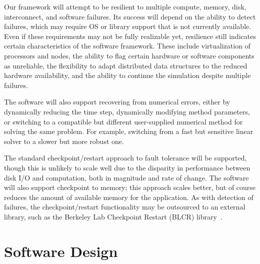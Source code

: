 \documentclass[10pt,twocolumn]{article}
\begin{document}
Our framework will attempt to be resilient to multiple compute,
memory, disk, interconnect, and software failures.  Its success will
depend on the ability to detect failures, which may require OS or
library support that is not currently available.  Even if these
requirements may not be fully realizable yet, resilience still
indicates certain characteristics of the software framework.  These
include virtualization of processors and nodes, the ability to flag
certain hardware or software components as unreliable, the flexibility
to adapt distributed data structures to the reduced hardware
availability, and the ability to continue the simulation despite
multiple failures.

The software will also support recovering from numerical errors,
either by dynamically reducing the time step, dynamically modifying
method parameters, or switching to a compatible but different
user-supplied numerical method for solving the same problem.  For
example, switching from a fast but sensitive linear solver to a slower
but more robust one.

The standard checkpoint/restart approach to fault tolerance will be
supported, though this is unlikely to scale well due to the disparity
in performance between disk I/O and computation, both in magnitude and
rate of change.  The software will also support checkpoint to
memory; this approach scales better, but of course reduces the amount
of available memory for the application.  As with detection of
failures, the checkpoint/restart functionality may be outsourced to
an external library, such as the Berkeley Lab Checkpoint Restart
(BLCR) library~\cite{wwwblcr}.


\section{Software Design} \label{s:design}

\end{document}
